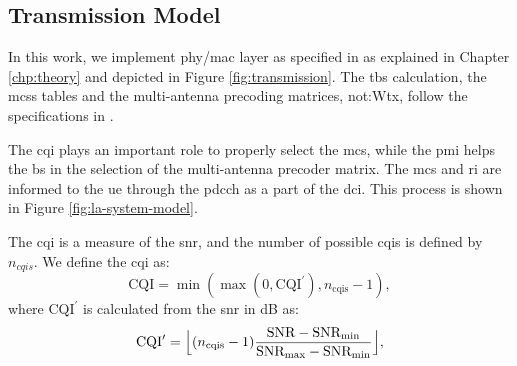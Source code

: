 \subsection{Transmission Model}

%
In this work, we implement \gls{phy}/\gls{mac} layer as specified in \cite{3gpp.38.212} as explained in Chapter \ref{chp:theory} and depicted in Figure \ref{fig:transmission}.
%
%
The \gls{tbs} calculation, the \glspl{mcs} tables and the multi-antenna precoding matrices, \gls{not:Wtx}, follow the specifications in \cite{3gpp.38.214}.
%


The \gls{cqi} plays an important role to properly select the \gls{mcs}, while the \gls{pmi} helps the \gls{bs} in the selection of the multi-antenna precoder matrix.
%
The \gls{mcs} and \gls{ri} are informed to the \gls{ue} through the \gls{pdcch} as a part of the \gls{dci}.
%
This process is shown in Figure \ref{fig:la-system-model}.


The \gls{cqi} is a measure of the \gls{snr}, and the number of possible \gls{cqi}s is defined by $n_{cqis}$. We define the \gls{cqi} as:
\begin{equation}\label{eq:cqi}
\textrm{CQI} = \min{
	(\max {(0, \textrm{CQI}^{\prime} ) }, n_{\text{cqis}} - 1)},
\end{equation}
%
\noindent where $\textrm{CQI}^{\prime}$ is calculated from the \gls{snr} in dB as:
\begin{equation}\label{eq:cqi_prime}
\textrm{CQI}^{\prime} = \floor[\Big]{(n_{\text{cqis}}-1)\frac{\textrm{SNR} - \textrm{SNR}_{\text{min}}}{\textrm{SNR}_{\text{max}}-\textrm{SNR}_{\text{min}}}},
\end{equation}
\noindent

